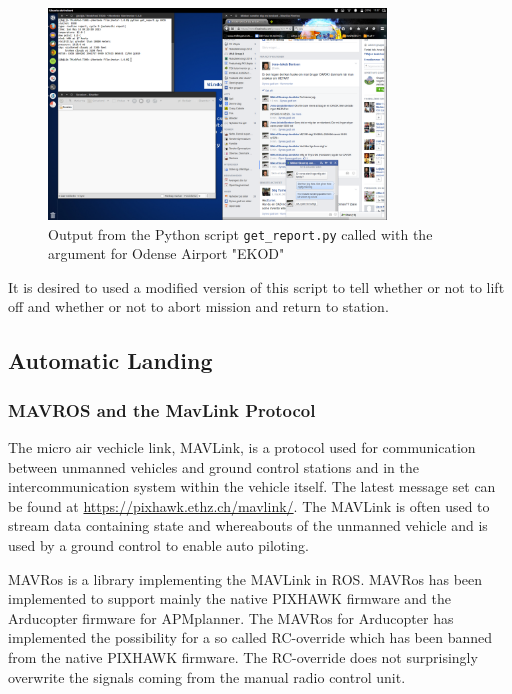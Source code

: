 \begin{figure}
	\centering
	\includegraphics[width=0.8\textwidth, clip=true, trim=1.5cm 21.3cm 35.7cm 0.8cm]{imgs/metar_download}
	\caption{Output from the Python script \texttt{get\_report.py} called with the argument for Odense Airport "EKOD"}
\end{figure}
It is desired to used a modified version of this script to tell whether or not to lift off and whether or not to abort mission and return to station.
\subsection{Automatic Landing}
\subsubsection{MAVROS and the MavLink Protocol}
The micro air vechicle link, MAVLink, is a protocol used for communication between unmanned vehicles and ground control stations and in the intercommunication system within the vehicle itself. The latest message set can be found at \url{https://pixhawk.ethz.ch/mavlink/}. The MAVLink is often used to stream data containing state and whereabouts of the unmanned vehicle and is used by a ground control to enable auto piloting. 


MAVRos is a library implementing the MAVLink in ROS. MAVRos has been implemented to support mainly the native PIXHAWK firmware and the Arducopter firmware for APMplanner.
The MAVRos for Arducopter has implemented the possibility for a so called RC-override which has been banned from the native PIXHAWK firmware. The RC-override does not surprisingly overwrite the signals coming from the manual radio control unit.

